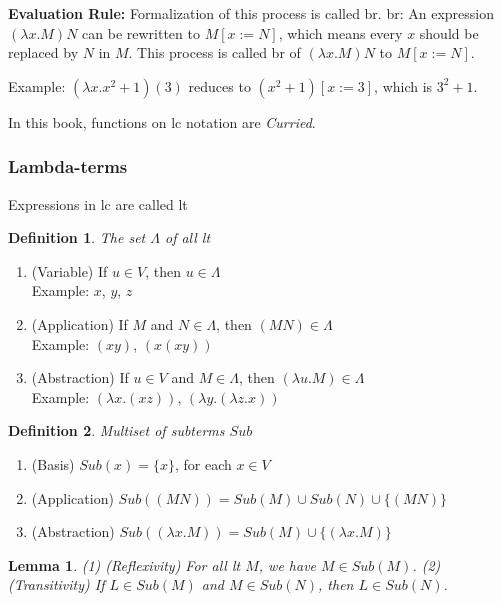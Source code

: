 \documentclass[12pt, a4paper]{article}
\newtheorem{definition}{Definition}
\newtheorem{lemma}{Lemma}
\begin{document}
\textbf{Evaluation Rule:} Formalization of this process is called \acrfull{br}. 
\acrshort{br}: An expression $(\lambda x. M)N$ can be rewritten to $M[x := N]$, which means every $x$ should be replaced by $N$ in $M$. This process 
is called \acrshort{br} of $(\lambda x. M)N$ to $M[x := N]$.

Example: $(\lambda x. x^2 + 1)(3)$ reduces to $(x^2 + 1)[x := 3]$, which is $3^2 + 1$.

In this book, functions on \acrshort{lc} notation are \textit{Curried}.

\subsubsection{Lambda-terms}
Expressions in \acrshort{lc} are called \acrfull{lt}

\begin{definition}
    The set $\Lambda$ of all \acrshort{lt}
\end{definition}

\begin{enumerate}
    \item (Variable) If $u \in V$, then $u \in \Lambda$ \\
    Example: $x$, $y$, $z$
    \item (Application) If $M$ and $N \in \Lambda$, then $(MN) \in \Lambda$  \\
    Example: $(x y)$, $(x(x y))$
    \item (Abstraction) If $u \in V$ and $M \in \Lambda$, then $(\lambda u. M) \in \Lambda$  \\
    Example: $(\lambda x. (x z))$, $(\lambda y. (\lambda z. x))$
\end{enumerate}


\begin{definition}
    Multiset of subterms $Sub$
\end{definition}

\begin{enumerate}
    \item (Basis) $Sub(x) = \{x\}$, for each $x \in V$
    \item (Application) $Sub((MN)) = Sub(M) \cup Sub(N) \cup \{(MN)\}$
    \item (Abstraction) $Sub((\lambda x. M)) = Sub(M) \cup \{(\lambda x. M)\}$
\end{enumerate}

\begin{lemma}
    (1) (Reflexivity) For all \acrshort{lt} $M$, we have $M \in Sub(M)$. 
    (2) (Transitivity) If $L \in Sub(M)$ and $M \in Sub(N)$, then $L \in Sub(N)$.
\end{lemma}
\end{document}

